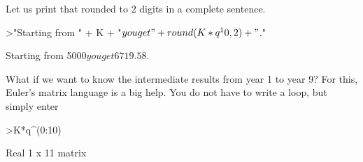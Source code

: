 \documentclass{article}
\begin{document}
\begin{eulernotebook}
\begin{eulercomment}
\begin{eulercomment}
\begin{eulercomment}
\begin{eulercomment}
\begin{eulercomment}
\begin{eulercomment}
\begin{eulercomment}
\begin{eulercomment}
\begin{eulercomment}
Let us print that rounded to 2 digits in a complete sentence.
\end{eulercomment}
\begin{eulerprompt}
>"Starting from " + K + "$ you get " + round(K*q^10,2) + "$."
\end{eulerprompt}
\begin{euleroutput}
  Starting from 5000$ you get 6719.58$.
\end{euleroutput}
\begin{eulercomment}
What if we want to know the intermediate results from year 1 to year 9? For
this, Euler's matrix language is a big help. You do not have to write a loop,
but simply enter
\end{eulercomment}
\begin{eulerprompt}
>K*q^(0:10)
\end{eulerprompt}
\begin{euleroutput}
  Real 1 x 11 matrix
  

\end{euleroutput}
\end{eulercomment}
\end{eulercomment}
\end{eulercomment}
\end{eulercomment}
\end{eulercomment}
\end{eulercomment}
\end{eulercomment}
\end{eulercomment}
\end{eulernotebook}
\end{document}

